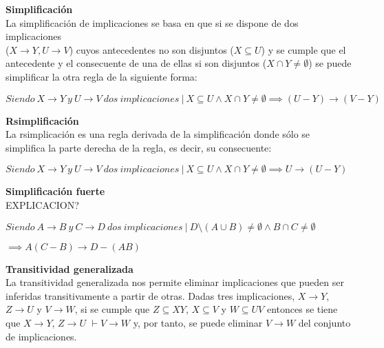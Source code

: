 
\bigskip
\textbf{Simplificaci\'on}\\
La simplificaci\'on de implicaciones se basa en que si se dispone de dos implicaciones \\ (\(X \to Y , U \to V\)) cuyos antecedentes no son disjuntos (\(X \subseteq U\)) y se cumple que el antecedente y el consecuente de una de ellas si son disjuntos (\(X \cap Y \neq \emptyset\)) se puede simplificar la otra regla de la siguiente forma:

\begin{center}
    \(Siendo \ X \to Y \ y \ U\to V \ dos \ implicaciones \ | \ X \subseteq U \wedge X \cap Y \neq \emptyset \implies (U - Y) \to (V - Y)\)
\end{center}


\bigskip
\textbf{Rsimplificaci\'on}\\
La rsimplicaci\'on es una regla derivada de la simplificaci\'on donde s\'olo se simplifica la parte derecha de la regla, es decir, su consecuente:

\begin{center}
    \(Siendo \ X \to Y \ y \ U\to V \ dos \ implicaciones \ | \ X \subseteq U \wedge X \cap Y \neq \emptyset \implies U \to (U - Y)\)
\end{center}


\bigskip

% 
\textbf{Simplificaci\'on fuerte}\\

EXPLICACION?

\begin{center}
    \(Siendo \ A \to B \ y \ C\to D \ dos \ implicaciones \ | \ D \setminus (A \cup B) \neq \emptyset \wedge B \cap C \neq \emptyset\)
\end{center}

\begin{center}
    \(\implies A(C-B) \to D - (AB)\)
\end{center}


\bigskip

\textbf{Transitividad generalizada}\\

La transitividad generalizada nos permite eliminar implicaciones que pueden ser inferidas transitivamente a partir de otras. Dadas tres implicaciones, \(X \to Y\), \(Z \to U\) y \(V \to W\), si se cumple que \(Z \subseteq XY \), \( X \subseteq V \) y \( W \subseteq UV \) entonces se tiene que  \(X \to Y\), \(Z \to U\) \( \vdash V \to W\) y, por tanto, se puede eliminar \(V \to W\) del conjunto de implicaciones.\\
\newpage

\newpage
